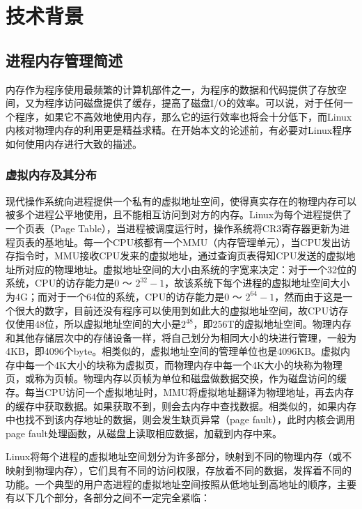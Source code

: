 
\chapter{技术背景}
\label{chap:RL}
\section{进程内存管理简述}
内存作为程序使用最频繁的计算机部件之一，为程序的数据和代码提供了存放空间，又为程序访问磁盘提供了缓存，提高了磁盘I/O的效率。可以说，对于任何一个程序，如果它不高效地使用内存，那么它的运行效率也将会十分低下，而Linux内核\cite{linux}对物理内存的利用更是精益求精。在开始本文的论述前，有必要对Linux程序如何使用内存进行大致的描述。

\subsection{虚拟内存及其分布}
现代操作系统向进程提供一个私有的虚拟地址空间，使得真实存在的物理内存可以被多个进程公平地使用，且不能相互访问到对方的内存。Linux为每个进程提供了一个页表（Page Table），当进程被调度运行时，操作系统将CR3寄存器更新为进程页表的基地址。每一个CPU核都有一个MMU（内存管理单元），当CPU发出访存指令时，MMU接收CPU发来的虚拟地址，通过查询页表得知CPU发送的虚拟地址所对应的物理地址。虚拟地址空间的大小由系统的字宽来决定：对于一个32位的系统，CPU的访存能力是0 ～ $2^{32}-1$，故该系统下每个进程的虚拟地址空间大小为4G；而对于一个64位的系统，CPU的访存能力是0 ～ $2^{64}-1$，然而由于这是一个很大的数字，目前还没有程序可以使用到如此大的虚拟地址空间，故CPU访存仅使用48位，所以虚拟地址空间的大小是$2^{48}$，即256T的虚拟地址空间。物理内存和其他存储层次中的存储设备一样，将自己划分为相同大小的块进行管理，一般为4KB，即4096个byte。相类似的，虚拟地址空间的管理单位也是4096KB。虚拟内存中每一个4K大小的块称为虚拟页，而物理内存中每一个4K大小的块称为物理页，或称为页帧。物理内存以页帧为单位和磁盘做数据交换，作为磁盘访问的缓存。每当CPU访问一个虚拟地址时，MMU将虚拟地址翻译为物理地址，再去内存的缓存中获取数据。如果获取不到，则会去内存中查找数据。相类似的，如果内存中也找不到该内存地址的数据，则会发生缺页异常（page fault），此时内核会调用page fault处理函数，从磁盘上读取相应数据，加载到内存中来。

\label{chap:mem}
Linux将每个进程的虚拟地址空间划分为许多部分，映射到不同的物理内存（或不映射到物理内存），它们具有不同的访问权限，存放着不同的数据，发挥着不同的功能。一个典型的用户态进程的虚拟地址空间按照从低地址到高地址的顺序，主要有以下几个部分，各部分之间不一定完全紧临：

